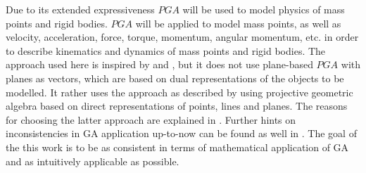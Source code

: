 Due to its extended expressiveness $PGA$ will be used to model physics of mass points and
rigid bodies. $PGA$ will be applied to model mass points, as well as velocity,
acceleration, force, torque, momentum, angular momentum, etc. in order to describe
kinematics and dynamics of mass points and rigid bodies. The approach used here is
inspired by \cite{Plane-based_PGA_Dorst-DeKennik:2022} and
\cite{Dynamics_in_PGA_plane-based_Dorst-DeKennik:2023}, but it does not use plane-based
$PGA$ with planes as vectors, which are based on dual representations of the objects to be
modelled. It rather uses the approach as described by \cite{Lengyel_pga-illuminated:2024}
using projective geometric algebra based on direct representations of points, lines and
planes. The reasons for choosing the latter approach are explained in
\cite{Lengyel_poor-foundations_GA:2024}. Further hints on inconsistencies in GA
application up-to-now can be found as well in \cite{Kritchevsky_case_against_GA:2024}. The
goal of the this work is to be as consistent in terms of mathematical application of GA
and as intuitively applicable as possible. \\









\newpage